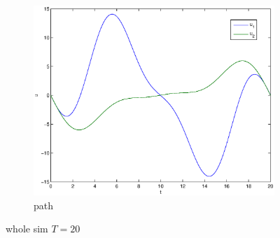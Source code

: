 \begin{figure}
\begin{subfigure}[b]{\textwidth}
\centering
\includegraphics[height=0.3\textheight]{img/final_15_15_20_u.eps}
\caption{path}
\end{subfigure}
\caption{whole sim $T=20$}
\end{figure}

